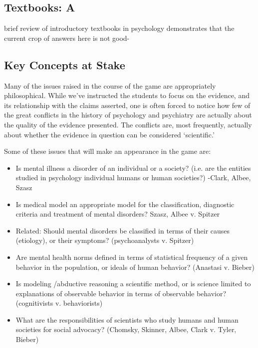\begin{refsection}
\section{Textbooks: A}
\label{textbooks:a}

brief review of introductory textbooks in psychology demonstrates that the current crop of answers here is not good-

\subsection{Key Concepts at Stake}
\label{keyconceptsatstake}

Many of the issues raised in the course of the game are appropriately philosophical. While we've instructed the students to focus on the evidence, and its relationship with the claims asserted, one is often forced to notice how few of the great conflicts in the history of psychology and psychiatry are actually about the quality of the evidence presented. The conflicts are, most frequently, actually about whether the evidence in question can be considered `scientific.' 

Some of these issues that will make an appearance in the game are:

\begin{itemize}
\item Is mental illness a disorder of an individual or a society? (i.e. are the entities studied in psychology individual humans or human societies?) -Clark, Albee, Szasz

\item Is medical model an appropriate model for the classification, diagnostic criteria and treatment of mental disorders? Szasz, Albee v. Spitzer

\item Related: Should mental disorders be classified in terms of their causes (etiology), or their symptoms? (psychoanalysts v. Spitzer)

\item Are mental health norms defined in terms of statistical frequency of a given behavior in the population, or ideals of human behavior? (Anastasi v. Bieber)

\item Is modeling \slash  abductive reasoning a scientific method, or is science limited to explanations of observable behavior in terms of observable behavior? (cognitivists v. behaviorists)

\item What are the responsibilities of scientists who study humans and human societies for social advocacy? (Chomsky, Skinner, Albee, Clark v. Tyler, Bieber)


\end{itemize}
\end{refsection}
